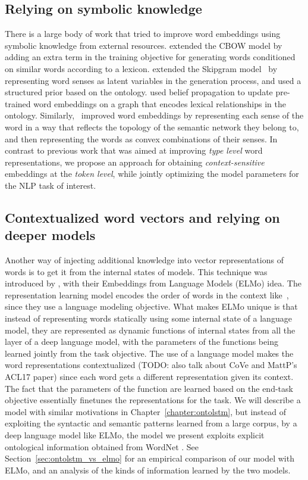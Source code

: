 \subsection{Relying on symbolic knowledge}
There is a large body of work that tried to improve word embeddings using symbolic knowledge from external resources.
\cite{yu:14} extended the CBOW model \citep{mikolov:13} by adding an extra term in the training objective for
generating words conditioned on similar words according to a lexicon.
\cite{jauhar:15} extended the Skipgram model~\citep{mikolov:13} by representing word senses as latent variables in
the generation process, and used a structured prior based on the ontology.
\cite{faruqui:15} used belief propagation to update pre-trained word embeddings on a graph that encodes lexical relationships in the ontology.
Similarly,~\cite{johansson2015embedding} improved word embeddings by representing each sense of the word in a way that reflects the topology of the semantic network they belong to, and then representing the words as convex combinations of their senses.
In contrast to previous work that was aimed at improving \textit{type level} word representations, we propose an approach for obtaining \textit{context-sensitive} embeddings at the \textit{token level}, while jointly optimizing the model parameters for the NLP task of interest.

\subsection{Contextualized word vectors and relying on deeper models}
Another way of injecting additional knowledge into vector representations of words is to get it from the internal
states of models. This technique was introduced by \cite{Peters:2018}, with their Embeddings from Language Models
(ELMo) idea. The representation learning model encodes the order of words in the context like~\cite{collobert2008unified},
since they use a language modeling objective. What makes ELMo unique is that
instead of representing words statically using some internal state of a language model, they are represented
as dynamic functions of internal states from all the layer of a deep language model, with the parameters of the
functions being learned jointly from the task objective.
The use of a language model makes the word representations contextualized
(TODO: also talk about CoVe and MattP's ACL17 paper) since each word gets a different representation given its
context. The fact that the parameters of the function are learned based on the end-task objective essentially
finetunes the representations for the task. We will describe a model with similar motivations in
Chapter~\ref{chapter:ontolstm}, but instead of exploiting the syntactic and semantic patterns learned from a large
corpus, by a deep language model like ELMo, the model we present exploits explicit ontological information obtained
from WordNet \citep{miller1995wordnet}. See Section~\ref{sec:ontolstm_vs_elmo} for an empirical comparison of our
model with ELMo, and an analysis of the kinds of information learned by the two models. 


